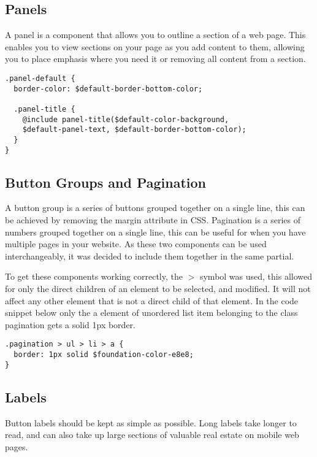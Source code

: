 \subsection*{Panels}
A panel is a component that allows you to outline a section of a web page. This enables you to view sections on your page as you add content to them, allowing you to place emphasis where you need it or removing all content from a section. 

\begin{lstlisting}[language=CSS3]
.panel-default {
  border-color: $default-border-bottom-color;

  .panel-title {
    @include panel-title($default-color-background, 
    $default-panel-text, $default-border-bottom-color);
  }
}
\end{lstlisting}

\newpage
\subsection*{Button Groups and Pagination}
A button group is a series of buttons grouped together on a single line, this can be achieved by removing the margin attribute in CSS. Pagination is a series of numbers grouped together on a single line, this can be useful for when you have multiple pages in your website. As these two components can be used interchangeably, it was decided to include them together in the same partial.

To get these components working correctly, the $>$ symbol was used, this allowed for only the direct children of an element to be selected, and modified. It will not affect any other element that is not a direct child of that element. In the code snippet below only the a element of unordered list item belonging to the class pagination gets a solid 1px border.   

\begin{lstlisting}[language=CSS3]
.pagination > ul > li > a {
  border: 1px solid $foundation-color-e8e8;
}
\end{lstlisting}

\subsection*{Labels}
Button labels should be kept as simple as possible. Long labels take longer to read, and can also take up large sections of valuable real estate on mobile web pages. 

